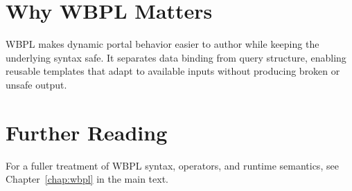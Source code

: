 \section{Why WBPL Matters}
WBPL makes dynamic portal behavior easier to author while keeping the underlying syntax safe. It separates data binding from query structure, enabling reusable templates that adapt to available inputs without producing broken or unsafe output.

\section{Further Reading}
For a fuller treatment of WBPL syntax, operators, and runtime semantics, see Chapter~\ref{chap:wbpl} in the main text.
